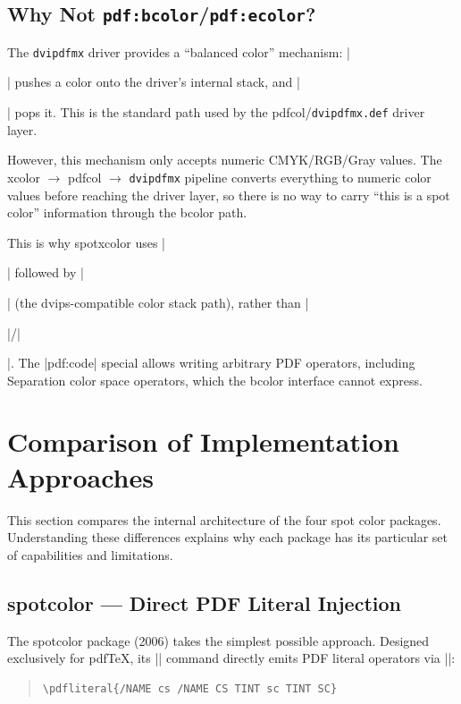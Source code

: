 \documentclass[luatex]{article}
\newcommand\pkg[1]{\textsf{#1}}
\begin{document}
\subsection{Why Not \texttt{pdf:bcolor}/\texttt{pdf:ecolor}?}

The \texttt{dvipdfmx} driver provides a ``balanced color'' mechanism:
|| pushes a color onto the driver's internal stack,
and || pops it.
This is the standard path used by the \pkg{pdfcol}/\texttt{dvipdfmx.def} driver layer.

However, this mechanism only accepts numeric CMYK/RGB/Gray values.
The \pkg{xcolor} $\to$ \pkg{pdfcol} $\to$ \texttt{dvipdfmx} pipeline
converts everything to numeric color values before reaching the driver layer,
so there is no way to carry ``this is a spot color'' information through the bcolor path.

This is why \pkg{spotxcolor} uses
|| followed by ||
(the dvips-compatible color stack path),
rather than ||/||.
The |pdf:code| special allows writing arbitrary PDF operators,
including Separation color space operators,
which the bcolor interface cannot express.


\section{Comparison of Implementation Approaches}

This section compares the internal architecture of the four spot color packages.
Understanding these differences explains why each package has its particular set of capabilities and limitations.

\subsection{\textsf{spotcolor} --- Direct PDF Literal Injection}

The \textsf{spotcolor} package (2006) takes the simplest possible approach.
Designed exclusively for pdfTeX, its |\SpotColor| command directly emits PDF literal operators via |\pdfliteral|:

\begin{quote}
\begin{verbatim}
\pdfliteral{/NAME cs /NAME CS TINT sc TINT SC}
\end{verbatim}
\end{quote}
\end{document}
